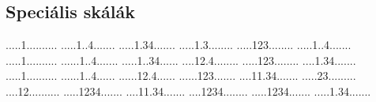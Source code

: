 \documentclass[a4paper,11pt]{article}
\begin{document}
\subsection{Speciális skálák}

          {.....1..........%
           .....1..4.......%
           .....1.34.......%
           .....1.3........%
           .....123........%
           .....1..4.......}
          {.....1..........%
           ......1..4.......%
           .....1..34......%
           ....12.4........%
           .....123........%
           ....1.34.......}
          {.....1..........%
           ......1..4......%
           ......12.4......%
           ......123.......%
           ....11.34.......%
           .....23.........}
          {....12..........%
           .....1234.......%
           ....11.34.......%
           ....1234........%
           .....1234.......%
           .....1.34.......}
\end{document}
